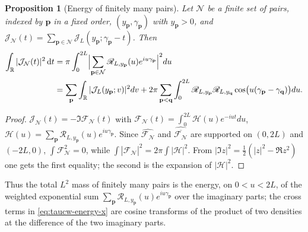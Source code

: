 \documentclass[11pt,a4paper]{article}
\numberwithin{equation}{section}
\newtheorem{proposition}[theorem]{Proposition}
\theoremstyle{definition}
\theoremstyle{remark}
\newcommand{\dd}{\,\mathrm dt}
\begin{document}
\begin{proposition}[Energy of finitely many pairs]\label{prop:taucw-energy}
Let $\mathcal N$ be a finite set of pairs, indexed by $\mathbf p$ in a fixed order, $(y_{\mathbf p},\gamma_{\mathbf p})$ with $y_{\mathbf p}>0$, and $\mathcal J_{\mathcal N}(t)=\sum_{\mathbf p\in\mathcal N}\mathcal J_L(y_{\mathbf p};\gamma_{\mathbf p}-t)$. Then
\begin{align}
\int_{\mathbb R}|\mathcal J_{\mathcal N}(t)|^2\dd&=\pi\int_0^{2L}\Bigl|\sum_{\mathbf p\in\mathcal N}\mathscr R_{L,y_{\mathbf p}}(u)e^{iu\gamma_{\mathbf p}}\Bigr|^2du\label{eq:taucw-energy}\\
&=\sum_{\mathbf p}\int_{\mathbb R}|\mathcal J_L(y_{\mathbf p};v)|^2dv+2\pi\sum_{\mathbf p<\mathbf q}\int_0^{2L}\mathscr R_{L,y_{\mathbf p}}\mathscr R_{L,y_{\mathbf q}}\cos\bigl(u(\gamma_{\mathbf p}-\gamma_{\mathbf q})\bigr)du .\label{eq:taucw-energy-x}
\end{align}
\end{proposition}
\begin{proof}
$\mathcal J_{\mathcal N}(t)=-\Im\mathcal F_{\mathcal N}(t)$ with $\mathcal F_{\mathcal N}(t)=\int_0^{2L}\mathcal H(u)e^{-iut}du$, $\mathcal H(u)=\sum_{\mathbf p}\mathscr R_{L,y_{\mathbf p}}(u)e^{iu\gamma_{\mathbf p}}$. Since $\widehat{\mathcal F_{\mathcal N}}$ and $\widehat{\overline{\mathcal F_{\mathcal N}}}$ are supported on $(0,2L)$ and $(-2L,0)$, $\int\mathcal F_{\mathcal N}^2=0$, while $\int|\mathcal F_{\mathcal N}|^2=2\pi\int|\mathcal H|^2$. From $|\Im z|^2=\frac12(|z|^2-\Re z^2)$ one gets the first equality; the second is the expansion of $|\mathcal H|^2$.
\end{proof}
Thus the total $L^2$ mass of finitely many pairs is the energy, on $0<u<2L$, of the weighted exponential sum $\sum_{\mathbf p}\mathscr R_{L,y_{\mathbf p}}(u)e^{iu\gamma_{\mathbf p}}$ over the imaginary parts; the cross terms in \eqref{eq:taucw-energy-x} are cosine transforms of the product of two densities at the difference of the two imaginary parts.
\end{document}
